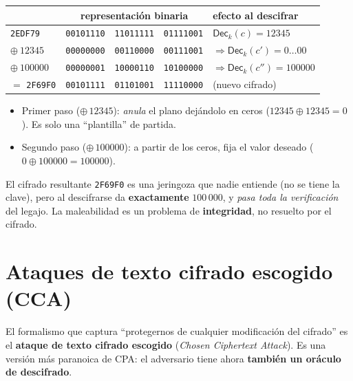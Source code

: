 \documentclass[11pt,a4paper]{article}
\newcommand{\xor}{\oplus}
\newcommand{\Dec}{\mathsf{Dec}}
\begin{document}
\begin{center}
\renewcommand{\arraystretch}{1.25}
\begin{tabular}{l l l l l}
\toprule
 & \multicolumn{3}{c}{representación binaria} & efecto al descifrar\\
\midrule
\texttt{2EDF79} & \texttt{00101110} & \texttt{11011111} & \texttt{01111001} & $\Dec_k(c)=12345$\\
$\xor\ 12345$  & \texttt{00000000} & \texttt{00110000} & \texttt{00111001} & $\Rightarrow \Dec_k(c')=0\ldots00$\\
$\xor\ 100000$ & \texttt{00000001} & \texttt{10000110} & \texttt{10100000} & $\Rightarrow \Dec_k(c'')=100000$\\
\midrule
$=$ \texttt{2F69F0} & \texttt{00101111} & \texttt{01101001} & \texttt{11110000} & (nuevo cifrado)\\
\bottomrule
\end{tabular}
\end{center}

\begin{itemize}[leftmargin=1.4em,itemsep=1pt]
  \item Primer paso ($\xor\,12345$): \emph{anula} el plano dejándolo en ceros
        ($12345\xor12345=0$). Es solo una ``plantilla'' de partida.
  \item Segundo paso ($\xor\,100000$): a partir de los ceros, fija el valor deseado
        ($0\xor100000=100000$).
\end{itemize}
El cifrado resultante \texttt{2F69F0} es una jeringoza que nadie entiende (no se tiene la
clave), pero al descifrarse da \textbf{exactamente} $100\,000$, y \emph{pasa toda la
verificación} del legajo. La maleabilidad es un problema de \textbf{integridad}, no
resuelto por el cifrado.

\section{Ataques de texto cifrado escogido (CCA)}

El formalismo que captura ``protegernos de cualquier modificación del cifrado'' es el
\textbf{ataque de texto cifrado escogido} (\emph{Chosen Ciphertext Attack}). Es una versión
más paranoica de CPA: el adversario tiene ahora \textbf{también un oráculo de descifrado}.
\end{document}
